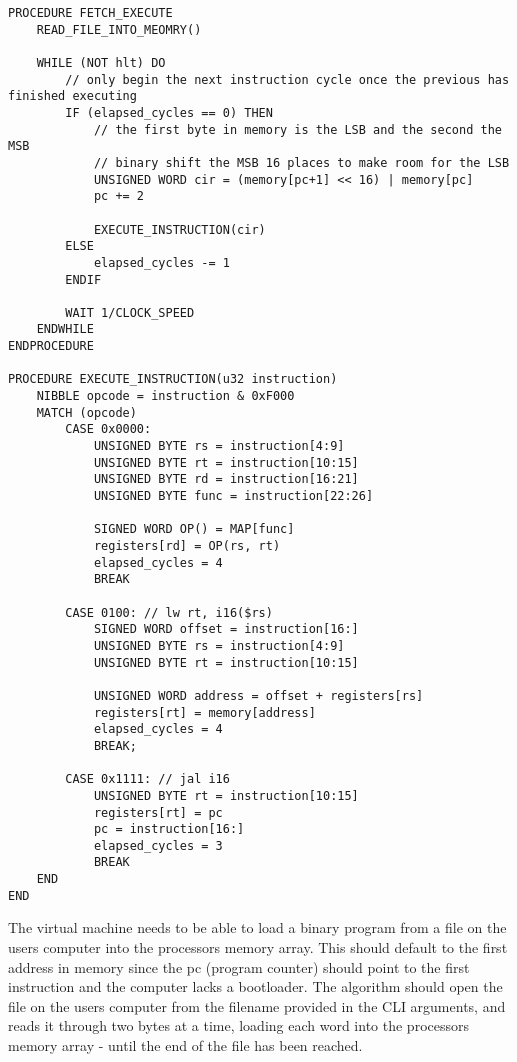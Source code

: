 \begin{lstlisting}
PROCEDURE FETCH_EXECUTE 
    READ_FILE_INTO_MEOMRY()

    WHILE (NOT hlt) DO 
        // only begin the next instruction cycle once the previous has finished executing
        IF (elapsed_cycles == 0) THEN 
            // the first byte in memory is the LSB and the second the MSB
            // binary shift the MSB 16 places to make room for the LSB
            UNSIGNED WORD cir = (memory[pc+1] << 16) | memory[pc]
            pc += 2

            EXECUTE_INSTRUCTION(cir)
        ELSE 
            elapsed_cycles -= 1
        ENDIF

        WAIT 1/CLOCK_SPEED
    ENDWHILE
ENDPROCEDURE

PROCEDURE EXECUTE_INSTRUCTION(u32 instruction)
    NIBBLE opcode = instruction & 0xF000 
    MATCH (opcode) 
        CASE 0x0000: 
            UNSIGNED BYTE rs = instruction[4:9]
            UNSIGNED BYTE rt = instruction[10:15]
            UNSIGNED BYTE rd = instruction[16:21]
            UNSIGNED BYTE func = instruction[22:26]

            SIGNED WORD OP() = MAP[func] 
            registers[rd] = OP(rs, rt)
            elapsed_cycles = 4
            BREAK

        CASE 0100: // lw rt, i16($rs)
            SIGNED WORD offset = instruction[16:]
            UNSIGNED BYTE rs = instruction[4:9]
            UNSIGNED BYTE rt = instruction[10:15]

            UNSIGNED WORD address = offset + registers[rs]
            registers[rt] = memory[address]
            elapsed_cycles = 4
            BREAK;

        CASE 0x1111: // jal i16
            UNSIGNED BYTE rt = instruction[10:15]
            registers[rt] = pc
            pc = instruction[16:]
            elapsed_cycles = 3
            BREAK
    END
END
\end{lstlisting}

The virtual machine needs to be able to load a binary program from a file on the users computer into the processors memory array. This should default to the first address in memory since the pc (program counter) should point to the first instruction and the computer lacks a bootloader. The algorithm should open the file on the users computer from the filename provided in the CLI arguments, and reads it through two bytes at a time, loading each word into the processors memory array - until the end of the file has been reached.

